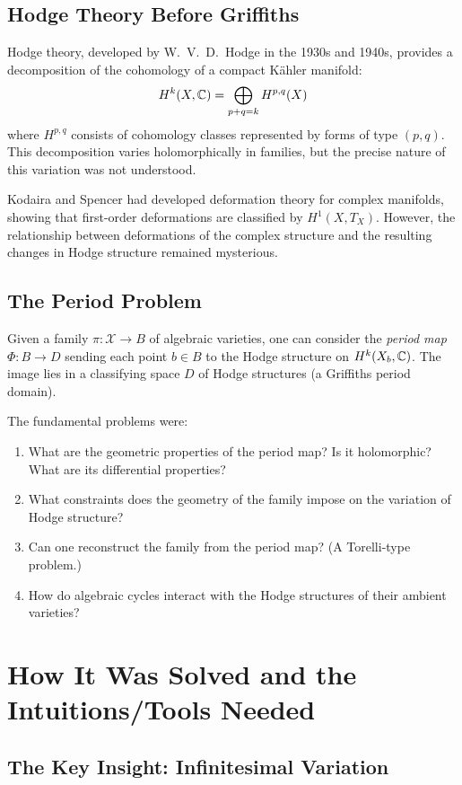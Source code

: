 \subsection{Hodge Theory Before Griffiths}

Hodge theory, developed by W.\ V.\ D.\ Hodge in the 1930s and 1940s, provides a decomposition of the cohomology of a compact K\"ahler manifold:
\[
H^k(X, \mathbb{C}) = \bigoplus_{p+q=k} H^{p,q}(X)
\]
where $H^{p,q}$ consists of cohomology classes represented by forms of type $(p,q)$. This decomposition varies holomorphically in families, but the precise nature of this variation was not understood.

Kodaira and Spencer had developed deformation theory for complex manifolds, showing that first-order deformations are classified by $H^1(X, T_X)$. However, the relationship between deformations of the complex structure and the resulting changes in Hodge structure remained mysterious.

\subsection{The Period Problem}

Given a family $\pi: \mathcal{X} \to B$ of algebraic varieties, one can consider the \textit{period map} $\Phi: B \to D$ sending each point $b \in B$ to the Hodge structure on $H^k(X_b, \mathbb{C})$. The image lies in a classifying space $D$ of Hodge structures (a Griffiths period domain).

The fundamental problems were:
\begin{enumerate}
    \item What are the geometric properties of the period map? Is it holomorphic? What are its differential properties?
    \item What constraints does the geometry of the family impose on the variation of Hodge structure?
    \item Can one reconstruct the family from the period map? (A Torelli-type problem.)
    \item How do algebraic cycles interact with the Hodge structures of their ambient varieties?
\end{enumerate}

\section{How It Was Solved and the Intuitions/Tools Needed}

\subsection{The Key Insight: Infinitesimal Variation}

